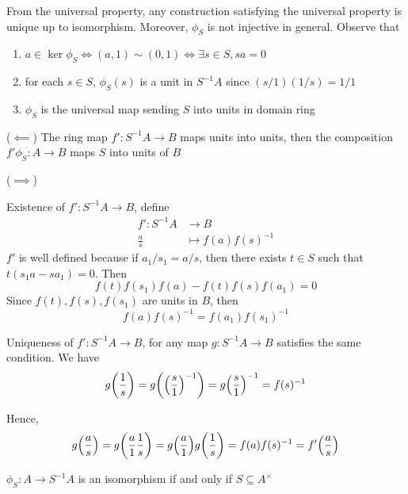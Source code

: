 \begin{remark}
	From the universal property, any construction satisfying the universal property is unique up to isomorphism. Moreover, $\phi_S$ is not injective in general. Observe that
	\begin{enumerate}
		\item $a \in \ker \phi_S \iff (a, 1) \sim (0, 1) \iff \exists s \in S, sa = 0$
		\item for each $s \in S$, $\phi_S(s)$ is a unit in $S^{-1} A$ since $(s / 1) (1 / s) = 1/1$
		\item $\phi_S$ is the universal map sending $S$ into units in domain ring
	\end{enumerate}
\end{remark}

\begin{longproof}
	($\impliedby$) The ring map $f': S^{-1} A \to B$ maps units into units, then the composition $f' \phi_S: A \to B$ maps $S$ into units of $B$
	
	($\implies$)
	
	Existence of $f': S^{-1} A \to B$, define
	\begin{align*}
		f': S^{-1} A &\to B \\
			\frac{a}{s} &\mapsto f(a) f(s)^{-1}
	\end{align*}
	$f'$ is well defined because if $a_1 / s_1 = a / s$, then there exists $t \in S$ such that $t(s_1 a - s a_1) = 0$. Then
	$$
		f(t) f(s_1) f(a) - f(t) f(s) f(a_1) = 0
	$$
	Since $f(t), f(s), f(s_1)$ are units in $B$, then 
	$$
		f(a) f(s)^{-1} = f(a_1) f(s_1)^{-1}
	$$
	
	Uniqueness of $f': S^{-1} A \to B$, for any map $g: S^{-1} A \to B$ satisfies the same condition. We have
	$$
		g\tuple*{\frac{1}{s}} = g\tuple*{\tuple*{\frac{s}{1}}^{-1}} = g\tuple*{\frac{s}{1}}^{-1} = f(s)^{-1}
	$$
	
	Hence, 
	$$
		g \tuple*{\frac{a}{s}} = g \tuple*{\frac{a}{1} \frac{1}{s}} = g \tuple*{\frac{a}{1}} g \tuple*{\frac{1}{s}} = f (a) f(s)^{-1} = f' \tuple*{\frac{a}{s}}
	$$
	
\end{longproof}

\begin{corollary}
	$\phi_S: A \to S^{-1} A$ is an isomorphism if and only if $S \subseteq A^\times$
\end{corollary}

